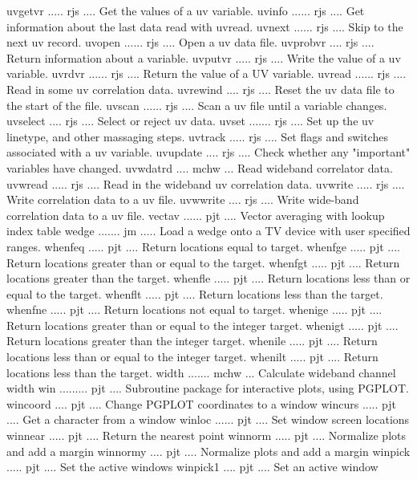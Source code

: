 {\eightpoint\begintt
uvgetvr ..... rjs .... Get the values of a uv variable. 
uvinfo ...... rjs .... Get information about the last data read with uvread. 
uvnext ...... rjs .... Skip to the next uv record. 
uvopen ...... rjs .... Open a uv data file. 
uvprobvr .... rjs .... Return information about a variable. 
\endtt}
{\eightpoint\begintt
uvputvr ..... rjs .... Write the value of a uv variable. 
uvrdvr ...... rjs .... Return the value of a UV variable. 
uvread ...... rjs .... Read in some uv correlation data. 
uvrewind .... rjs .... Reset the uv data file to the start of the file. 
uvscan ...... rjs .... Scan a uv file until a variable changes. 
\endtt}
{\eightpoint\begintt
uvselect .... rjs .... Select or reject uv data. 
uvset ....... rjs .... Set up the uv linetype, and other massaging steps. 
uvtrack ..... rjs .... Set flags and switches associated with a uv variable. 
uvupdate .... rjs .... Check whether any "important" variables have changed. 
uvwdatrd .... mchw ... Read wideband correlator data. 
\endtt}
{\eightpoint\begintt
uvwread ..... rjs .... Read in the wideband uv correlation data. 
uvwrite ..... rjs .... Write correlation data to a uv file. 
uvwwrite .... rjs .... Write wide-band correlation data to a uv file. 
vectav ...... pjt .... Vector averaging with lookup index table 
wedge ....... jm ..... Load a wedge onto a TV device with user specified ranges.
\endtt}
{\eightpoint\begintt
whenfeq ..... pjt .... Return locations equal to target. 
whenfge ..... pjt .... Return locations greater than or equal to the target. 
whenfgt ..... pjt .... Return locations greater than the target. 
whenfle ..... pjt .... Return locations less than or equal to the target. 
whenflt ..... pjt .... Return locations less than the target. 
\endtt}
{\eightpoint\begintt
whenfne ..... pjt .... Return locations not equal to target. 
whenige ..... pjt .... Return locations greater than or equal to the integer target. 
whenigt ..... pjt .... Return locations greater than the integer target. 
whenile ..... pjt .... Return locations less than or equal to the integer target.
whenilt ..... pjt .... Return locations less than the target. 
\endtt}
{\eightpoint\begintt
width ....... mchw ... Calculate wideband channel width 
win ......... pjt .... Subroutine package for interactive plots, using PGPLOT. 
wincoord .... pjt .... Change PGPLOT coordinates to a window 
wincurs ..... pjt .... Get a character from a window 
winloc ...... pjt .... Set window screen locations 
\endtt}
{\eightpoint\begintt
winnear ..... pjt .... Return the nearest point 
winnorm ..... pjt .... Normalize plots and add a margin 
winnormy .... pjt .... Normalize plots and add a margin 
winpick ..... pjt .... Set the active windows 
winpick1 .... pjt .... Set an active window 
\endtt}
